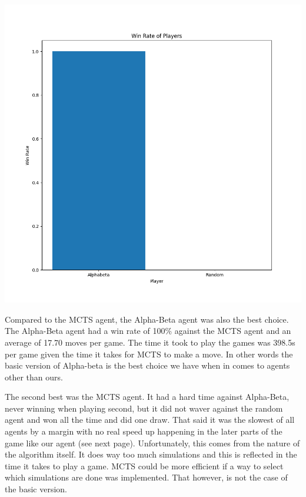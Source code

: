 \documentclass[11pt,a4paper]{report}
\begin{document}
\begin{answers}[20cm]
    
    \includegraphics[scale=.35]{graphs/abvsrand.png}


    Compared to the MCTS agent, the Alpha-Beta agent was also the best choice. The Alpha-Beta agent had a win rate of 100\% against the MCTS agent and an average of
    17.70 moves per game. The time it took to play the games was 398.5s per game given the time it takes for MCTS to make a move. In other words the basic 
    version of Alpha-beta is the best choice we have when in comes to agents other than ours.

    
\end{answers}

\begin{answers}[23cm]
    The second best was the MCTS agent. It had a hard time against Alpha-Beta, never winning when playing second, but it did not waver against the random agent and won all the time and did one draw. 
    That said it was the slowest of all agents by a margin with no real speed up happening in the later parts of the game like our agent (see next page). 
    Unfortunately, this comes from the nature of the algorithm itself. It does way too much simulations and this is reflected in the time it takes to play a game. 
    MCTS could be more efficient if a way to select which simulations are done was implemented. That however, is not the case of the basic
    version. 

\end{answers}
\end{document}
